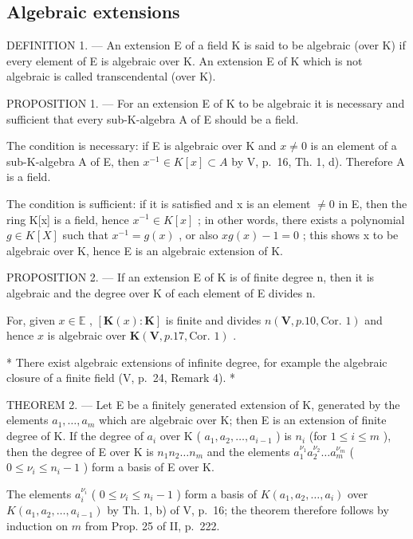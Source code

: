 \subsection{Algebraic extensions}

DEFINITION 1. --- An extension E of a field K is said to be algebraic (over K) if every element of E is algebraic over K. An extension E of K which is not algebraic is called transcendental (over K).

PROPOSITION 1. --- For an extension E of K to be algebraic it is necessary and sufficient that every sub-K-algebra A of E should be a field.

The condition is necessary: if E is algebraic over K and \(x \neq 0\) is an element of a sub-K-algebra A of E, then \(x^{-1} \in K[x] \subset A\) by V, p.~16, Th. 1, d). Therefore A is a field.

The condition is sufficient: if it is satisfied and x is an element \(\neq 0\) in E, then the ring K{[}x{]} is a field, hence \(x^{-1} \in K[x]\) ; in other words, there exists a polynomial \(g \in K[X]\) such that \(x^{-1} = g(x)\) , or also \(xg(x) - 1 = 0\) ; this shows x to be algebraic over K, hence E is an algebraic extension of K.

PROPOSITION 2. --- If an extension E of K is of finite degree n, then it is algebraic and the degree over K of each element of E divides n.

For, given \(x \in \mathbb{E}\) , \([\mathbf{K}(x): \mathbf{K}]\) is finite and divides \(n(\mathbf{V}, p. 10, \text{Cor. } 1)\) and hence \(x\) is algebraic over \(\mathbf{K}(\mathbf{V}, p. 17, \text{Cor. } 1)\) .

* There exist algebraic extensions of infinite degree, for example the algebraic closure of a finite field (V, p.~24, Remark 4). *

THEOREM 2. --- Let E be a finitely generated extension of K, generated by the elements \(a_1, \ldots, a_m\) which are algebraic over K; then E is an extension of finite degree of K. If the degree of \(a_i\) over K ( \(a_1, a_2, \ldots, a_{i-1}\) ) is \(n_i\) (for \(1 \leq i \leq m\) ), then the degree of E over K is \(n_1 n_2 \ldots n_m\) and the elements \(a_1^{\nu_1} a_2^{\nu_2} \ldots a_m^{\nu_m}\) ( \(0 \leq \nu_i \leq n_i - 1\) ) form a basis of E over K.

The elements \(a_i^{\nu_i}\) ( \(0 \leqslant \nu_i \leqslant n_i - 1\) ) form a basis of \(K(a_1, a_2, \ldots, a_i)\) over \(K(a_1, a_2, \ldots, a_{i-1})\) by Th. 1, b) of V, p.~16; the theorem therefore follows by induction on \(m\) from Prop. 25 of II, p.~222.

